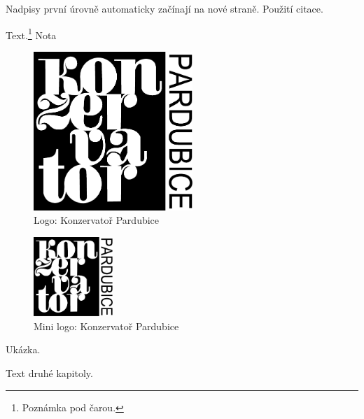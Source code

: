 
\noindent
Nadpisy první úrovně automaticky začínají na nové straně.
Použití citace.~\cite{harry}

\noindent Text.\footnote{Poznámka pod čarou.} Nota 


\begin{figure}[!ht]
	\begin{center}
		\includegraphics[width=60mm]{./obrazky/kp-logo.pdf}
    \end{center}

	\caption{Logo: Konzervatoř Pardubice}
\end{figure}

\begin{figure}[!ht]
	\begin{center}
		\includegraphics[width=30mm]{./obrazky/kp-logo.pdf}
    \end{center}

	\caption{Mini logo: Konzervatoř Pardubice}
\end{figure}

\noindent Ukázka.

\noindent Text druhé kapitoly.





